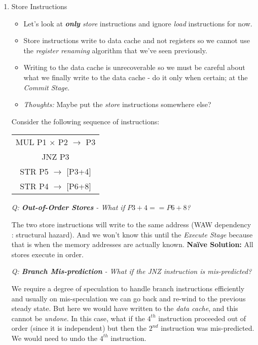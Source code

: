 \documentclass[12pt]{article}
\newenvironment{QandA}{\begin{enumerate}[label=\bfseries\arabic*.]\bfseries}
                      {\end{enumerate}}
\newenvironment{answered}{\par\quad\normalfont}{}
\begin{document}
\begin{QandA}
\ 

\item Store Instructions
\begin{answered}
\vspace{-0.85cm}
\begin{itemize}
    \item Let's look at \textit{\textbf{only} store} instructions and ignore \textit{load} instructions for now.
    \item Store instructions write to data cache and not registers so we cannot use the \textit{register renaming} algorithm that we've seen previously. 
    \item Writing to the data cache is unrecoverable so we must be careful about what we finally write to the data cache - do it only when certain; at the \textit{Commit Stage}. 
    \item \textit{Thoughts:} Maybe put the \textit{store} instructions somewhere else?
\end{itemize}

Consider the following sequence of instructions:
\begin{center}
\begin{tabular}{ |c| } 
 \hline
 MUL P1 $\times$ P2 $\rightarrow$ P3 \\ 
 JNZ P3 \\ 
 STR P5 $\rightarrow$ [P3+4] \\
 STR P4 $\rightarrow$ [P6+8] \\
 \hline
\end{tabular}
\end{center}

\textit{Q: \textbf{Out-of-Order Stores} - What if $P3+4==P6+8$?}

\quad The two store instructions will write to the same address (WAW dependency : structural hazard). And we won't know this until the \textit{Execute Stage} because that is when the memory addresses are actually known. \textbf{Na\"ive Solution:} All stores execute in order. 

\textit{Q: \textbf{Branch Mis-prediction} - What if the JNZ instruction is mis-predicted?}

\quad We require a degree of speculation to handle branch instructions efficiently and usually on mis-speculation we can go back and re-wind to the previous steady state. But here we would have written to the \textit{data cache}, and this cannot be \textit{undone}. In this case, what if the $4^{th}$ instruction proceeded out of order (since it is independent) but then the $2^{nd}$ instruction was mis-predicted. We would need to undo the $4^{th}$ instruction. 
\end{answered}


\end{QandA}
\end{document}
